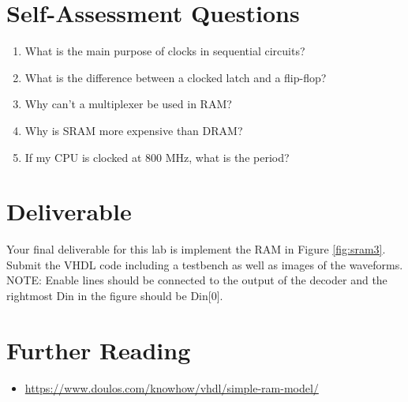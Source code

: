 \documentclass[a4paper, 11pt,oneside]{article}
\begin{document}
\section{Self-Assessment Questions}
\begin{enumerate}
\item What is the main purpose of clocks in sequential circuits?
\item What is the difference between a clocked latch and a flip-flop?
\item Why can't a multiplexer be used in RAM?
\item Why is SRAM more expensive than DRAM?
\item If my CPU is clocked at 800 MHz, what is the period?
\end{enumerate}


\section{Deliverable}
Your final deliverable for this lab is implement the RAM in Figure 
 \ref{fig:sram3}. Submit the VHDL code including a testbench as well as images 
of the waveforms. NOTE: Enable lines should be connected to the output of the 
decoder and the rightmost Din in the figure should be Din[0].

\section{Further Reading}
\begin{itemize}
\item 
\href{https://www.doulos.com/knowhow/vhdl/simple-ram-model/}
{https://www.doulos.com/knowhow/vhdl/simple-ram-model/}
\end{itemize}





\nocite{*}
\end{document}
